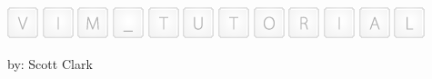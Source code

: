 \documentclass[12pt]{article}
\begin{document}
\begin{center}
  \includegraphics{Keys/key_V.png}
  \includegraphics{Keys/key_I.png}
  \includegraphics{Keys/key_M.png}
  \includegraphics{Keys/key_underscore.png}
  \includegraphics{Keys/key_T.png}
  \includegraphics{Keys/key_U.png}
  \includegraphics{Keys/key_T.png}
  \includegraphics{Keys/key_O.png}
  \includegraphics{Keys/key_R.png}
  \includegraphics{Keys/key_I.png}
  \includegraphics{Keys/key_A.png}
  \includegraphics{Keys/key_L.png}
\end{center}

\begin{flushright}
  by: Scott Clark
\end{flushright}
\end{document}
